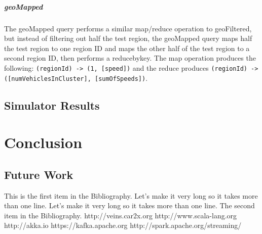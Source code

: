 \documentclass{thesis}
\begin{document}
    \paragraph{geoMapped}
        The geoMapped query performs a similar map/reduce operation to geoFiltered, but instead of filtering out half the
        test region, the geoMapped query maps half the test region to one region ID and maps the other half of the
        test region to a second region ID, then performs a reducebykey. The map operation produces the following:
        \verb|(regionId) -> (1, [speed])| and the reduce produces \verb|(regionId) -> ([numVehiclesInCluster], [sumOfSpeeds])|.

\section{Simulator Results}

\chapter{Conclusion}
\section{Future Work}


\begin{singlespace}
\begin{thebibliography}{99}
 This is the first item in the Bibliography.
Let's make it very long so it takes more than one line.
Let's make it very long so it takes more than one line.
 The second item in the Bibliography.
    http://veins.car2x.org %
    http://www.scala-lang.org %
    http://akka.io %
    https://kafka.apache.org %
    http://spark.apache.org/streaming/ %
\end{thebibliography}
\end{singlespace}
\end{document}
